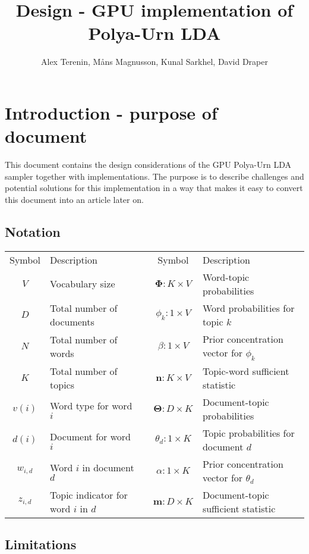 \documentclass{article}
\title{Design - GPU implementation of Polya-Urn LDA}
\author{Alex Terenin, M{\aa}ns Magnusson, Kunal Sarkhel, David Draper}
\newcommand{\m}{\expandafter\mathbf} %
\begin{document}
\maketitle


\section{Introduction - purpose of document}

This document contains the design considerations of the GPU Polya-Urn LDA sampler together with implementations. The purpose is to describe challenges and potential solutions for this implementation in a way that makes it easy to convert this document into an article later on.

\subsection{Notation}

\begin{center}
\small{
\begin{tabular}{c l c c l}
\hline
Symbol & Description && Symbol & Description
\\
\cline{1-2} \cline{4-5}
$V$ & Vocabulary size && $\m{\Phi} : K \times V$ & Word-topic probabilities
\\
$D$ & Total number of documents && $\phi_k : 1 \times V$ & Word probabilities for topic $k$
\\
$N$ & Total number of words && $\beta : 1 \times V$ & Prior concentration vector for $\phi_k$
\\
$K$ & Total number of topics && $\m{n} : K \times V$ & Topic-word sufficient statistic
\\
$v(i)$ & Word type for word $i$ && $\m{\Theta} : D \times K$ & Document-topic probabilities
\\
$d(i)$ & Document for word $i$ && $\theta_d : 1 \times K$ & Topic probabilities for document $d$
\\
$w_{i,d}$ & Word $i$ in document $d$ && $\alpha : 1 \times K$ & Prior concentration vector for $\theta_d$
\\
$z_{i,d}$ & Topic indicator for word $i$ in $d$ && $\m{m} : D \times K$ & Document-topic sufficient statistic
\\
\hline
\end{tabular}
}
\end{center}

\subsection{Limitations}
\end{document}
